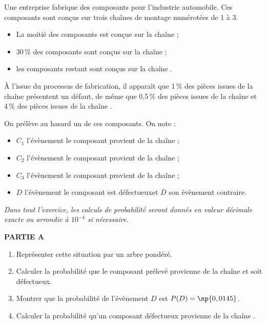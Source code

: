 \medskip

Une entreprise fabrique des composants pour l'industrie automobile. Ces composants sont conçus sur trois chaînes de montage numérotées de 1 à 3.
\begin{itemize}
\item[$\bullet~~$] La moitié des composants est conçue sur la chaîne  ;
\item[$\bullet~~$]  30\,\% des composants sont conçus sur la chaîne ;
\item[$\bullet~~$]  les composants restant sont conçus sur la chaîne .
\end{itemize}

À l'issue du processus de fabrication, il apparaît que 1\,\% des pièces issues de la chaîne  présentent un défaut, de même que 0,5\,\% des pièces issues de la chaîne  et 4\,\% des pièces issues de la chaîne .

On prélève au hasard un de ces composants. On note :

\begin{itemize}
\item[$\bullet~~$] $C_1$ l'évènement \og le composant provient de la chaîne  \fg{} ;
\item[$\bullet~~$] $C_2$ l'évènement \og le composant provient de la chaîne  \fg{} ;
\item[$\bullet~~$] $C_3$ l'évènement \og le composant provient de la chaîne  \fg{} ;
\item[$\bullet~~$] $D$ l'évènement \og le composant est défectueux\fg et $\overline{D}$ son évènement contraire.
\end{itemize}

\emph{Dans tout l'exercice, les calculs de probabilité seront donnés en valeur décimale exacte ou arrondie à $10^{-4}$ si nécessaire}.

\medskip

\textbf{PARTIE A}

\medskip

\begin{enumerate}
\item Représenter cette situation par un arbre pondéré.
\item Calculer la probabilité que le composant prélevé provienne de la chaîne  et soit
défectueux.
\item Montrer que la probabilité de l'évènement $D$ est $P(D) = \np{0,0145}$.
\item Calculer la probabilité qu'un composant défectueux provienne de la chaîne .
\end{enumerate}

